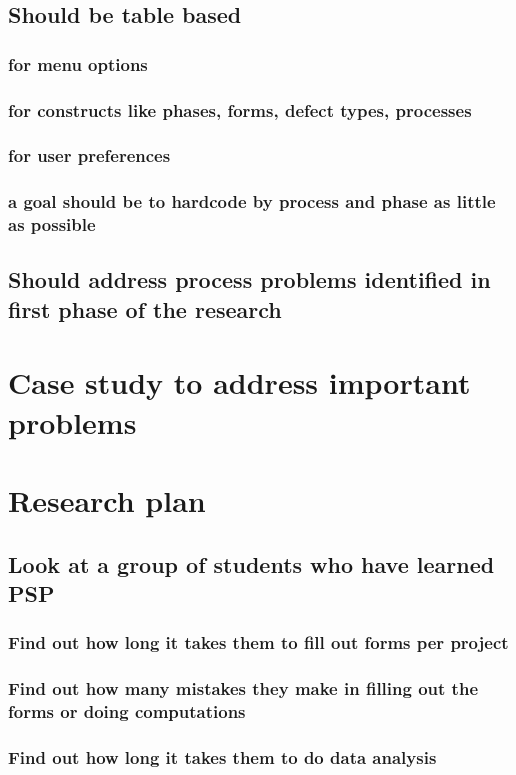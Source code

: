 \section{Should be table based}
\subsection{for menu options}
\subsection{for constructs like phases, forms, defect types, processes}
\subsection{for user preferences}
\subsection{a goal should be to hardcode by process and phase as little as
possible}
\section{Should address process problems identified in first phase of the research}
\chapter{Case study to address important problems}
\chapter{Research plan}
\section{Look at a group of students who have learned PSP}
\subsection{Find out how long it takes them to fill out forms per project}
\subsection{Find out how many mistakes they make in filling out the forms or doing computations}
\subsection{Find out how long it takes them to do data analysis}
